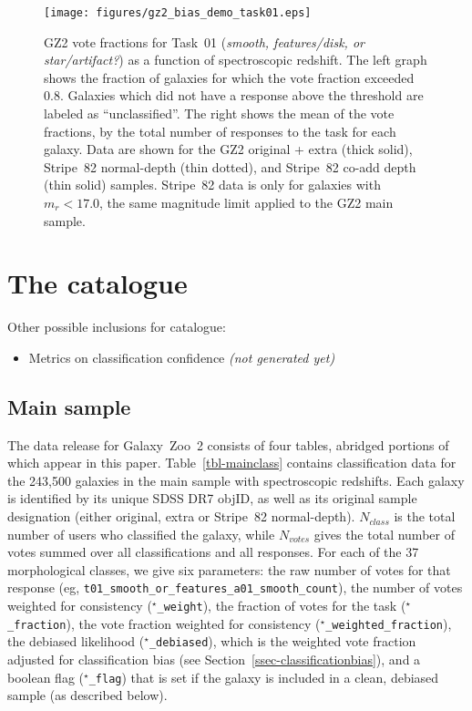 \documentclass[useAMS,usenatbib]{mn2e}
\begin{document}
\begin{figure}
\texttt{[image: figures/gz2\_bias\_demo\_task01.eps]}
\caption{GZ2 vote fractions for Task~01 ({\it smooth, features/disk, or star/artifact?}) as a function of spectroscopic redshift. The left graph shows the fraction of galaxies for which the vote fraction exceeded 0.8. Galaxies which did not have a response above the threshold are labeled as ``unclassified''. The right shows the mean of the vote fractions, by the total number of responses to the task for each galaxy. Data are shown for the GZ2 original + extra (thick solid), Stripe~82 normal-depth (thin dotted), and Stripe~82 co-add depth (thin solid) samples. Stripe~82 data is only for galaxies with $m_r < 17.0$, the same magnitude limit applied to the GZ2 main sample.  
\label{fig-task01}}
\end{figure}


\section{The catalogue} \label{sec-catalogue}

Other possible inclusions for catalogue:
\begin{itemize}
	\item Metrics on classification confidence \citep[Table 04,][]{lin11} {\it (not generated yet)}
\end{itemize}

\subsection{Main sample}\label{ssec-catalogue_main}

The data release for Galaxy~Zoo~2 consists of four tables, abridged portions of which appear in this paper. Table~\ref{tbl-mainclass} contains classification data for the 243,500 galaxies in the main sample with spectroscopic redshifts. Each galaxy is identified by its unique SDSS DR7 objID, as well as its original sample designation (either original, extra or Stripe~82 normal-depth). $N_{class}$ is the total number of users who classified the galaxy, while $N_{votes}$ gives the total number of votes summed over all classifications and all responses. For each of the 37 morphological classes, we give six parameters: the raw number of votes for that response (eg, {\tt t01\_smooth\_or\_features\_a01\_smooth\_count}), the number of votes weighted for consistency ({\tt $^\star$\_weight}), the fraction of votes for the task ({\tt $^\star$\_fraction}), the vote fraction weighted for consistency ({\tt $^\star$\_weighted\_fraction}), the debiased likelihood ({\tt $^\star$\_debiased}), which is the weighted vote fraction adjusted for classification bias (see Section~\ref{ssec-classificationbias}), and a boolean flag ({\tt $^\star$\_flag}) that is set if the galaxy is included in a clean, debiased sample (as described below).
\end{document}
